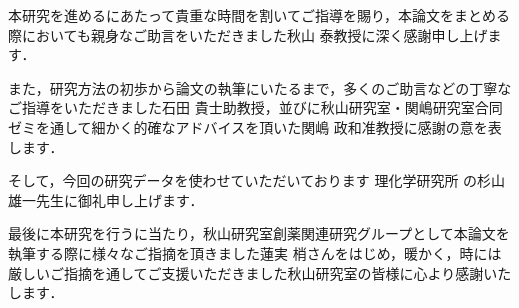 \begin{syaji}

本研究を進めるにあたって貴重な時間を割いてご指導を賜り，本論文をまとめる際においても親身なご助言をいただきました秋山 泰教授に深く感謝申し上げます．

また，研究方法の初歩から論文の執筆にいたるまで，多くのご助言などの丁寧なご指導をいただきました石田 貴士助教授，並びに秋山研究室・関嶋研究室合同ゼミを通して細かく的確なアドバイスを頂いた関嶋 政和准教授に感謝の意を表します．

そして，今回の研究データを使わせていただいております
理化学研究所%
の杉山 雄一先生に御礼申し上げます．



最後に本研究を行うに当たり，秋山研究室創薬関連研究グループとして本論文を執筆する際に様々なご指摘を頂きました蓮実 梢さんをはじめ，暖かく，時には厳しいご指摘を通してご支援いただきました秋山研究室の皆様に心より感謝いたします．


\end{syaji}
